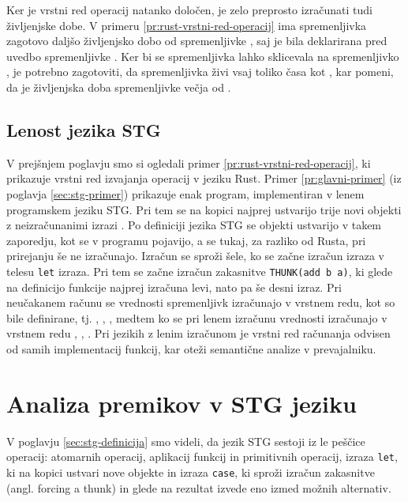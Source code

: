

Ker je vrstni red operacij natanko določen, je zelo preprosto izračunati tudi življenjske dobe. V primeru \ref{pr:rust-vrstni-red-operacij} ima spremenljivka  zagotovo daljšo življenjsko dobo od spremenljivke , saj je bila deklarirana pred uvedbo spremenljivke . Ker bi se spremenljivka  lahko sklicevala na spremenljivko , je potrebno zagotoviti, da spremenljivka  živi vsaj toliko časa kot , kar pomeni, da je življenjska doba spremenljivke  večja od .

\subsection{Lenost jezika STG}

V prejšnjem poglavju smo si ogledali primer \ref{pr:rust-vrstni-red-operacij}, ki prikazuje vrstni red izvajanja operacij v jeziku Rust. Primer \ref{pr:glavni-primer} (iz poglavja \ref{sec:stg-primer}) prikazuje enak program, implementiran v lenem programskem jeziku STG. Pri tem se na kopici najprej ustvarijo trije novi objekti z neizračunanimi izrazi . Po definiciji jezika STG se objekti ustvarijo v takem zaporedju, kot se v programu pojavijo, a se tukaj, za razliko od Rusta, pri prirejanju še ne izračunajo. Izračun se sproži šele, ko se začne izračun izraza  v telesu \texttt{let} izraza. Pri tem se začne izračun zakasnitve \texttt{THUNK(add b a)}, ki glede na definicijo funkcije  najprej izračuna levi, nato pa še desni izraz. Pri neučakanem računu se vrednosti spremenljivk izračunajo v vrstnem redu, kot so bile definirane, tj. , , , medtem ko se pri lenem izračunu vrednosti izračunajo v vrstnem redu , , . Pri jezikih z lenim izračunom je vrstni red računanja odvisen od samih implementacij funkcij, kar oteži semantične analize v prevajalniku.

\section{Analiza premikov v STG jeziku}
\label{sec:analiza-premikov}

V poglavju \ref{sec:stg-definicija} smo videli, da jezik STG sestoji iz le peščice operacij: atomarnih operacij, aplikacij funkcij in primitivnih operacij, izraza \texttt{let}, ki na kopici ustvari nove objekte in izraza \texttt{case}, ki sproži izračun zakasnitve (angl. forcing a thunk) in glede na rezultat izvede eno izmed možnih alternativ.

